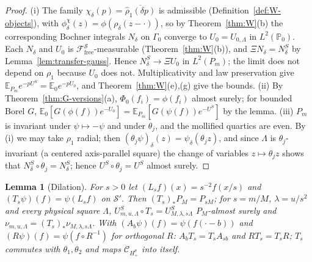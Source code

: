 \documentclass[11pt]{article}
\theoremstyle{plain}
\newtheorem{lemma}[theorem]{Lemma}
\theoremstyle{definition}
\theoremstyle{remark}
\newcommand{\E}{\mathbb{E}}
\newcommand{\PP}{\mathbb{P}}
\newcommand{\cC}{\mathcal{C}}
\newcommand{\cF}{\mathcal{F}}
\newcommand{\cS}{\mathcal{S}}
\newcommand{\conj}[1]{\overline{#1}}
\begin{document}
\begin{proof}
(i) The family $\chi_\delta(p)=\conj{\hat\rho_1(\delta p)}$ is admissible
(Definition~\ref{def:W-objects}), with $\phi^{\chi}_\delta(z)=\phi(\rho_\delta(z-\cdot))$, so by
Theorem~\ref{thm:W}(b) the corresponding Bochner integrals $N_\delta$ on $\Gamma_0$
converge to $U_0=U_{0,\Lambda}$ in $L^{2}(\PP_0)$. Each $N_\delta$ and $U_0$ is
$\cF^{\cS}_{\mathrm{free}}$-measurable (Theorem~\ref{thm:W}(b)), and
$\Xi N_\delta=N^{S}_\delta$ by Lemma~\ref{lem:transfer-gauss}. Hence $N^{S}_\delta\to\Xi U_0$ in
$L^{2}(P_m)$; the limit does not depend on $\rho_1$ because $U_0$ does not.
Multiplicativity and law preservation give $\E_{P_m}e^{-pU^{S}}=\E_0e^{-pU_0}$, and
Theorem~\ref{thm:W}(e),(g) give the bounds. (ii) By
Theorem~\ref{thm:G-versions}(a), $\Phi_0(f_i)=\phi(f_i)$ almost surely; for bounded
Borel $G$, $\E_0[G(\phi(f))e^{-U_0}]=\E_{P_m}[G(\psi(f))e^{-U^{S}}]$ by the lemma. (iii)
$P_m$ is invariant under $\psi\mapsto-\psi$ and under $\theta_j$, and the mollified
quartics are even. By (i) we may take $\rho_1$ radial; then
$(\theta_j\psi)_\delta(z)=\psi_\delta(\theta_jz)$, and since $\Lambda$ is $\theta_j$-invariant (a centered
axis-parallel square) the change of variables $z\mapsto\theta_jz$ shows that
$N^{S}_\delta\circ\theta_j=N^{S}_\delta$; hence $U^{S}\circ\theta_j=U^{S}$ almost surely.
\end{proof}

\begin{lemma}[Dilation]\label{lem:dilation}
For $s>0$ let $(L_sf)(x)=s^{-2}f(x/s)$ and $(T_s\psi)(f)=\psi(L_sf)$ on $\cS'$. Then
$(T_s)_*P_M=P_{sM}$; for $s=m/M$, $\lambda=u/s^{2}$ and every physical square $\Lambda$,
$U^{S}_{m,u,\Lambda}\circ T_s=U^{S}_{M,\lambda,s\Lambda}$ $P_M$-almost surely and
$\nu_{m,u,\Lambda}=(T_s)_*\nu_{M,\lambda,s\Lambda}$. With $(A_b\psi)(f)=\psi(f(\cdot-b))$ and
$(R\psi)(f)=\psi(f\circ R^{-1})$ for orthogonal $R$: $A_bT_s=T_sA_{sb}$ and $RT_s=T_sR$;
$T_s$ commutes with $\theta_1,\theta_2$ and maps $\cC_{H^{\theta}_{+}}$ into itself.
\end{lemma}
\end{document}
